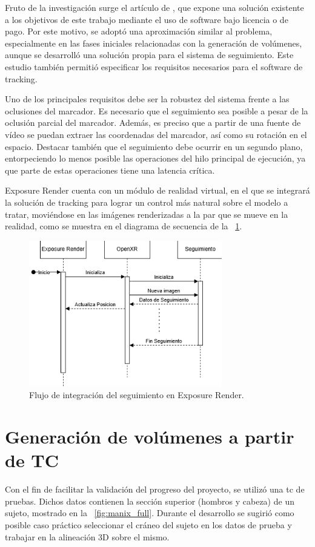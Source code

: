 Fruto de la investigación surge el artículo de \citeauthor{MoretaMartinez2020}, que expone una solución existente a los objetivos de este trabajo mediante el uso de software bajo licencia o de pago. Por este motivo, se adoptó una aproximación similar al problema, especialmente en las fases iniciales relacionadas con la generación de volúmenes, aunque se desarrolló una solución propia para el sistema de seguimiento. Este estudio también permitió especificar los requisitos necesarios para el software de tracking.

Uno de los principales requisitos debe ser la robustez del sistema frente a las oclusiones del marcador. Es necesario que el seguimiento sea posible a pesar de la oclusión parcial del marcador. Además, es preciso que a partir de una fuente de vídeo se puedan extraer las coordenadas del marcador, así como su rotación en el espacio. Destacar también que el seguimiento debe ocurrir en un segundo plano, entorpeciendo lo menos posible las operaciones del hilo principal de ejecución, ya que parte de estas operaciones tiene una latencia crítica.

Exposure Render cuenta con un módulo de realidad virtual, en el que se integrará la solución de tracking para lograr un control más natural sobre el modelo a tratar, moviéndose en las imágenes renderizadas a la par que se mueve en la realidad, como se muestra en el diagrama de secuencia de la \figurename~\ref{fig:flow_exposure}.

\begin{figure}
	\centering
	\includegraphics[width=0.75\textwidth]{imaxes/flow_exposure.png}
	\caption{Flujo de integración del seguimiento en Exposure Render.}
	\label{fig:flow_exposure}
\end{figure}

\section{Generación de volúmenes a partir de TC}
Con el fin de facilitar la validación del progreso del proyecto, se utilizó una \acrshort{tc} de pruebas. Dichos datos contienen la sección superior (hombros y cabeza) de un sujeto, mostrado en la \figurename~\ref{fig:manix_full}. Durante el desarrollo se sugirió como posible caso práctico seleccionar el cráneo del sujeto en los datos de prueba y trabajar en la alineación 3D sobre el mismo.

